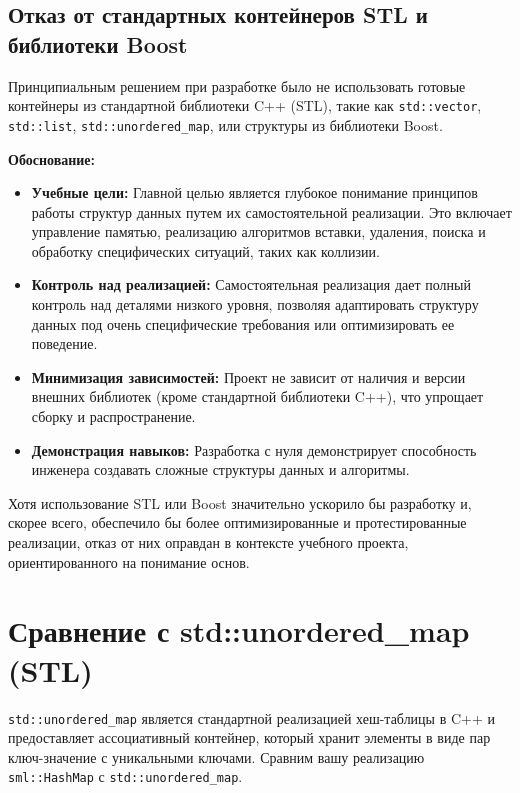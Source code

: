 \documentclass[a4paper,12pt]{article}
\begin{document}
\subsection{Отказ от стандартных контейнеров STL и библиотеки Boost}

Принципиальным решением при разработке было не использовать готовые контейнеры из стандартной библиотеки C++ (STL), такие как \texttt{std::vector}, \texttt{std::list}, \texttt{std::unordered\_map}, или структуры из библиотеки Boost.

\textbf{Обоснование:}
\begin{itemize}
    \item \textbf{Учебные цели:} Главной целью является глубокое понимание принципов работы структур данных путем их самостоятельной реализации. Это включает управление памятью, реализацию алгоритмов вставки, удаления, поиска и обработку специфических ситуаций, таких как коллизии.
    \item \textbf{Контроль над реализацией:} Самостоятельная реализация дает полный контроль над деталями низкого уровня, позволяя адаптировать структуру данных под очень специфические требования или оптимизировать ее поведение.
    \item \textbf{Минимизация зависимостей:} Проект не зависит от наличия и версии внешних библиотек (кроме стандартной библиотеки C++), что упрощает сборку и распространение.
    \item \textbf{Демонстрация навыков:} Разработка с нуля демонстрирует способность инженера создавать сложные структуры данных и алгоритмы.
\end{itemize}
Хотя использование STL или Boost значительно ускорило бы разработку и, скорее всего, обеспечило бы более оптимизированные и протестированные реализации, отказ от них оправдан в контексте учебного проекта, ориентированного на понимание основ.

\section{Сравнение с std::unordered\_map (STL)}

\texttt{std::unordered\_map} является стандартной реализацией хеш-таблицы в C++ и предоставляет ассоциативный контейнер, который хранит элементы в виде пар ключ-значение с уникальными ключами. Сравним вашу реализацию \texttt{sml::HashMap} с \texttt{std::unordered\_map}.
\end{document}
